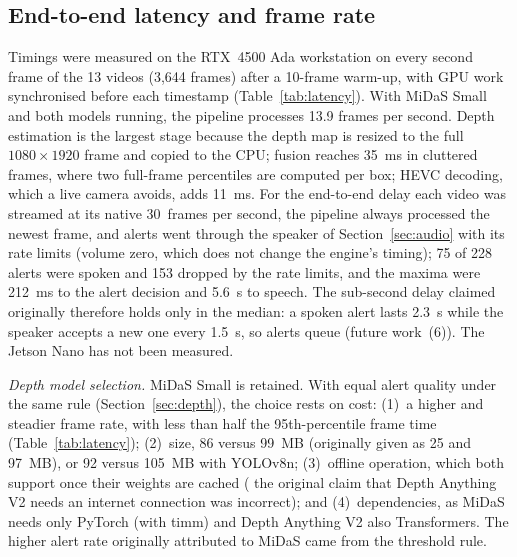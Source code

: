 \documentclass[3p,times,procedia]{elsarticle}
\DeclareRobustCommand{\rev}[1]{{\hlattr=1 #1}}
\DeclareRobustCommand{\rev}[1]{\hl{#1}}
\DeclareRobustCommand{\rev}[1]{#1}
\begin{document}
\subsection{End-to-end latency and frame rate}
\label{sec:latency}

Timings were measured on the RTX~4500 Ada workstation on every second frame
of the 13 videos (3,644 frames) after a 10-frame warm-up, with GPU work
synchronised before each timestamp (Table~\ref{tab:latency}). \rev{With MiDaS
Small and both models running, the pipeline processes 13.9 frames per
second.} \rev{Depth estimation is the largest stage because the depth map is
resized to the full $1080 \times 1920$ frame and copied to the CPU}; fusion
reaches 35~ms in cluttered frames, where two full-frame percentiles are
computed per box; HEVC decoding, which a live camera avoids, adds 11~ms.
For the end-to-end delay each video was streamed at its native
30~frames per second, the pipeline always processed the newest frame, and
alerts went through the speaker of Section~\ref{sec:audio} with its rate
limits (volume zero, which does not change the engine's timing); \rev{75 of 228
alerts were spoken and 153 dropped by the rate limits}, and the maxima were
212~ms to the alert decision and 5.6~s to speech. \rev{The sub-second delay
claimed originally therefore holds only in the median: a spoken alert lasts
2.3~s while the speaker accepts a new one every 1.5~s, so alerts queue}
(future work~(6)). \rev{The Jetson Nano has not been measured.}

\emph{Depth model selection.} \rev{MiDaS Small is retained. With equal alert
quality under the same rule (Section~\ref{sec:depth}), the choice rests on
cost}: (1)~a higher and steadier frame rate, with less than half the
95th-percentile frame time (Table~\ref{tab:latency}); \rev{(2)~size, 86 versus 99~MB
(originally given as 25 and 97~MB)}, or 92 versus 105~MB with YOLOv8n;
(3)~offline operation, which both support once their weights are cached (\rev{the
original claim that Depth Anything V2 needs an internet connection was
incorrect}); and (4)~dependencies, as MiDaS needs only PyTorch (with
timm) and Depth Anything V2 also Transformers. \rev{The higher alert
rate originally attributed to MiDaS came from the threshold rule.}
\end{document}
